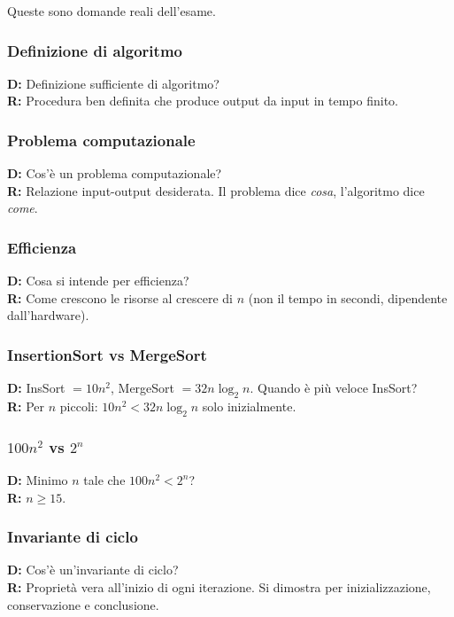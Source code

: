 \documentclass[a4paper, 11pt]{article}
\theoremstyle{definition}
\theoremstyle{remark}
\theoremstyle{remark}
\begin{document}
	\begin{hardnote}
		Queste sono domande reali dell'esame.\footnotemark
	\end{hardnote}
	
	
	\subsubsection*{Definizione di algoritmo}
	\textbf{D:} Definizione sufficiente di algoritmo?\\
	\textbf{R:} Procedura ben definita che produce output da input in tempo finito.
	
	\subsubsection*{Problema computazionale}
	\textbf{D:} Cos'è un problema computazionale?\\
	\textbf{R:} Relazione input-output desiderata. Il problema dice \textit{cosa},
	l'algoritmo dice \textit{come}.
	
	\subsubsection*{Efficienza}
	\textbf{D:} Cosa si intende per efficienza?\\
	\textbf{R:} Come crescono le risorse al crescere di $n$
	(non il tempo in secondi, dipendente dall'hardware).
	
	\subsubsection*{InsertionSort vs MergeSort}
	\textbf{D:} InsSort $= 10n^2$, MergeSort $= 32n\log_2 n$. Quando è più
	veloce InsSort?\\
	\textbf{R:} Per $n$ piccoli: $10n^2 < 32n\log_2 n$ solo inizialmente.
	
	\subsubsection*{\texorpdfstring{$100n^2$ vs $2^n$}{100n2 vs 2n}}
	\textbf{D:} Minimo $n$ tale che $100n^2 < 2^n$?\\
	\textbf{R:} $n \ge 15$.
	
	\subsubsection*{Invariante di ciclo}
	\textbf{D:} Cos'è un'invariante di ciclo?\\
	\textbf{R:} Proprietà vera all'inizio di ogni iterazione. Si dimostra per
	inizializzazione, conservazione e conclusione.
	
\end{document}
